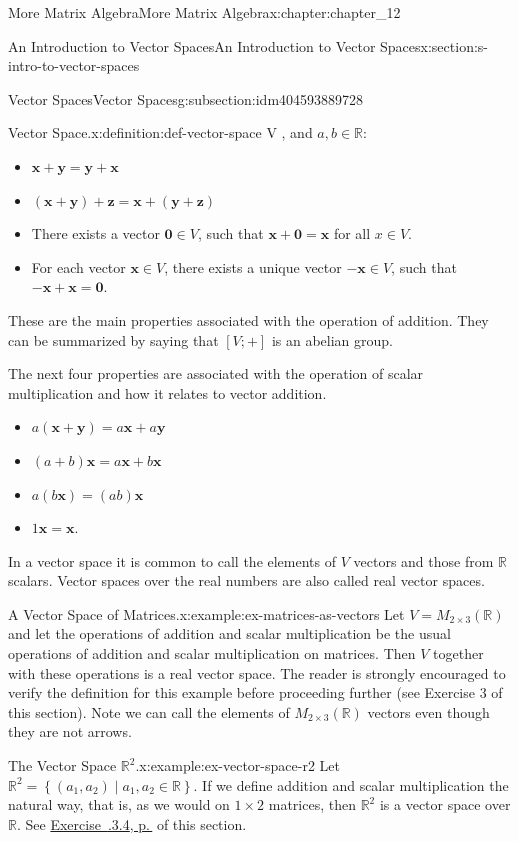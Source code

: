 \documentclass[twoside,10pt,]{book}
\newcommand{\xreffont}{\relax}
\numberwithin{equation}{section}
\renewcommand{\vec}[1]{\mathbf{#1}}
\begin{document}
\begin{chapterptx}{More Matrix Algebra}{}{More Matrix Algebra}{}{}{x:chapter:chapter_12}
\begin{sectionptx}{An Introduction to Vector Spaces}{}{An Introduction to Vector Spaces}{}{}{x:section:s-intro-to-vector-spaces}
\begin{subsectionptx}{Vector Spaces}{}{Vector Spaces}{}{}{g:subsection:idm404593889728}
\begin{definition}{Vector Space.}{x:definition:def-vector-space}
V\) , and \(a,b \in \mathbb{R}\):%
\begin{itemize}[label=\textbullet]
\item{}\(\vec{x}+ \vec{y}= \vec{y}+ \vec{x}\)%
\item{}\(\left(\vec{x}+ \vec{y}\right)+ \vec{z}= \vec{x}+\left(
\vec{y}+\vec{z}\right)\)%
\item{}There exists a vector  \(\vec{0}\in V\), such that \(\vec{x}+\vec{0} =
\vec{x}\) for all \(x \in V\).%
\item{}For each vector  \(\vec{x}\in V\), there exists a unique vector \(-\vec{x}\in V\), such that \(-\vec{x} +\vec{x}= \vec{0}\).%
\end{itemize}
These are the main properties associated with the operation of addition. They can be summarized by saying that \([V; +]\) is an abelian group.%
\par
The next four properties are associated with the operation of scalar multiplication and how it relates to vector addition.%
\begin{itemize}[label=\textbullet]
\item{}\(a\left(\vec{x}+ \vec{y} \right) =a \vec{x}+a \vec{y}\)%
\item{}\((a +b)\vec{x}= a \vec{x} + b \vec{x}\)%
\item{}\(a \left(b \vec{x}\right) = (a b)\vec{x}\)%
\item{}\(1\vec{x} = \vec{x}\).%
\end{itemize}
%
\end{definition}
In a vector space it is common to call the elements of \(V\) vectors and those from \(\mathbb{R}\) scalars.  Vector spaces over the real numbers are also called real vector spaces.%
\begin{example}{A Vector Space of Matrices.}{x:example:ex-matrices-as-vectors}%
Let \(V = M_{2\times 3}(\mathbb{R})\) and let the operations of addition and scalar multiplication be the usual operations of addition and scalar multiplication on matrices. Then \(V\) together with these operations is a  real vector space. The reader is strongly encouraged to verify the definition for this example before proceeding further (see Exercise 3 of this section). Note we can call the elements of \(M_{2\times 3}(\mathbb{R})\) vectors even though they are not arrows.%
\end{example}
\begin{example}{The Vector Space \(\mathbb{R}^2\).}{x:example:ex-vector-space-r2}%
Let \(\mathbb{R}^2 = \left\{\left(a_1, a_2 \right) \mid a_1,a_2 \in  \mathbb{R}\right\}\). If we define addition and scalar multiplication the natural way, that is, as we would on \(1\times 2\) matrices, then \(\mathbb{R}^2\) is a vector space over \(\mathbb{R}\). See \hyperlink{x:exercise:exercise-12-3-4}{Exercise~{\xreffont 12.3.3.4}, p.\,\pageref{x:exercise:exercise-12-3-4}} of this section.%

\end{example}
\end{subsectionptx}
\end{sectionptx}
\end{chapterptx}
\end{document}
